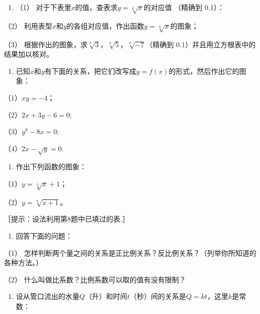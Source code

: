 \begin{enumerate}[start=8]
\item
  （1） 对于下表里\(x\)的值，查表求\(y = \sqrt[6]{x}\)的对应值 （精确到
  0.1）：
\end{enumerate}

{\centering
\scriptsize\setlength{\tabcolsep}{2.2pt}%
\par
}

（2）
利用表型\(x\)和\(y\)的各组对应值，作出函数\(y = \sqrt[8]{x}\)的图象；

（3）
根据作出的图象，求\(\sqrt[8]{3}\)，\(\sqrt[8]{5}\)，\(\sqrt[8]{-7}\)（精确到
0.1）并且用立方根表中的结果加以核对。

\begin{enumerate}[start=9]
\item
  已知\(x\)和\(y\)有下面的关系，把它们改写成\(y = f(x)\)的形式，然后作出它的图象：
\end{enumerate}

（1）\(xy = -4\)；

（2）\(2x + 3y - 6 = 0;\)

（3）\(y^{8}-8x=0;\)

（4）\(2x - \sqrt{y} = 0.\)

\begin{enumerate}[start=10]
\item
  作出下列函数的图象：
\end{enumerate}

（1）\(y=\sqrt[3]{x}+1\)；

（2）\(y = \sqrt[8]{x + 1}\)。

［提示：设法利用第8题中已填过的表.］

\begin{enumerate}[start=11]
\item
  回答下面的问题：
\end{enumerate}

（1）
怎样判断两个量之间的关系是正比例关系？反比例关系？（列举你所知道的各种方法。）

（2） 什么叫做比系数？比例系数可以取的值有没有限制？

\begin{enumerate}[start=12]
\item
  设从管口流出的水量\(Q\)（升）和时间\(t\)（秒）间的关系是\(Q = kt\)，这里\(k\)是常数：
\end{enumerate}


